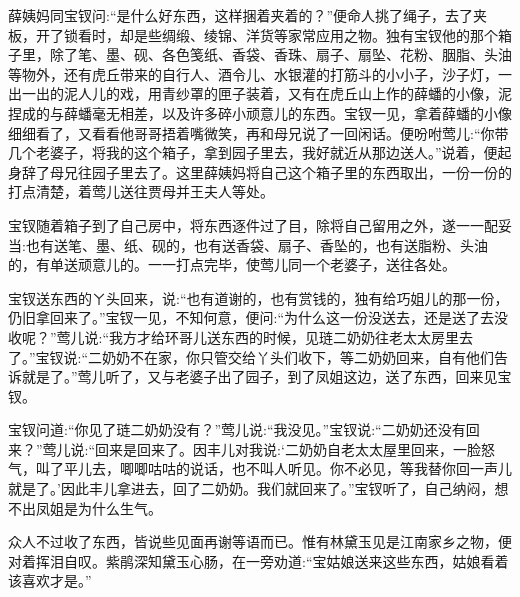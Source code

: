 \begin{parag}
    薛姨妈同宝钗问:“是什么好东西，这样捆着夹着的？”便命人挑了绳子，去了夹板，开了锁看时，却是些绸缎、绫锦、洋货等家常应用之物。独有宝钗他的那个箱子里，除了笔、墨、砚、各色笺纸、香袋、香珠、扇子、扇坠、花粉、胭脂、头油等物外，还有虎丘带来的自行人、酒令儿、水银灌的打筋斗的小小子，沙子灯，一出一出的泥人儿的戏，用青纱罩的匣子装着，又有在虎丘山上作的薛蟠的小像，泥捏成的与薛蟠毫无相差，以及许多碎小顽意儿的东西。宝钗一见，拿着薛蟠的小像细细看了，又看看他哥哥捂着嘴微笑，再和母兄说了一回闲话。便吩咐莺儿:“你带几个老婆子，将我的这个箱子，拿到园子里去，我好就近从那边送人。”说着，便起身辞了母兄往园子里去了。这里薛姨妈将自己这个箱子里的东西取出，一份一份的打点清楚，着莺儿送往贾母并王夫人等处。
\end{parag}


\begin{parag}
    宝钗随着箱子到了自己房中，将东西逐件过了目，除将自己留用之外，遂一一配妥当:也有送笔、墨、纸、砚的，也有送香袋、扇子、香坠的，也有送脂粉、头油的，有单送顽意儿的。一一打点完毕，使莺儿同一个老婆子，送往各处。
\end{parag}


\begin{parag}
    宝钗送东西的ㄚ头回来，说:“也有道谢的，也有赏钱的，独有给巧姐儿的那一份，仍旧拿回来了。”宝钗一见，不知何意，便问:“为什么这一份没送去，还是送了去没收呢？”莺儿说:“我方才给环哥儿送东西的时候，见琏二奶奶往老太太房里去了。”宝钗说:“二奶奶不在家，你只管交给丫头们收下，等二奶奶回来，自有他们告诉就是了。”莺儿听了，又与老婆子出了园子，到了凤姐这边，送了东西，回来见宝钗。
\end{parag}


\begin{parag}
    宝钗问道:“你见了琏二奶奶没有？”莺儿说:“我没见。”宝钗说:“二奶奶还没有回来？”莺儿说:“回来是回来了。因丰儿对我说:‘二奶奶自老太太屋里回来，一脸怒气，叫了平儿去，唧唧咕咕的说话，也不叫人听见。你不必见，等我替你回一声儿就是了。’因此丰儿拿进去，回了二奶奶。我们就回来了。”宝钗听了，自己纳闷，想不出凤姐是为什么生气。
\end{parag}


\begin{parag}
    众人不过收了东西，皆说些见面再谢等语而已。惟有林黛玉见是江南家乡之物，便对着挥泪自叹。紫鹃深知黛玉心肠，在一旁劝道:“宝姑娘送来这些东西，姑娘看着该喜欢才是。”
\end{parag}


